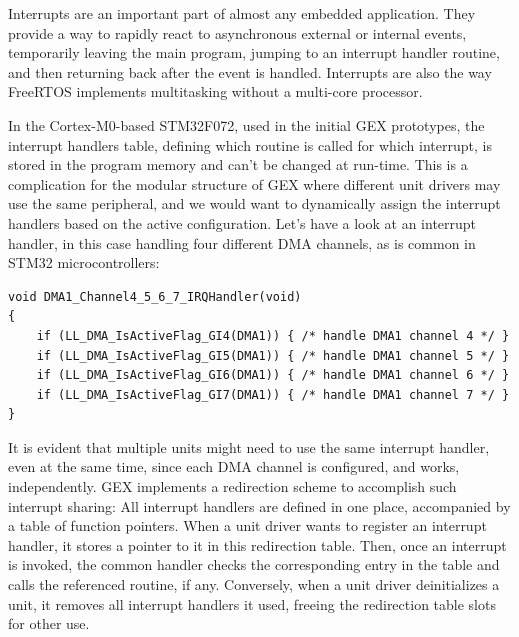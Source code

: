 Interrupts are an important part of almost any embedded application. They provide a way to rapidly react to asynchronous external or internal events, temporarily leaving the main program, jumping to an interrupt handler routine, and then returning back after the event is handled. Interrupts are also the way FreeRTOS implements multitasking without a multi-core processor.

In the Cortex-M0-based STM32F072, used in the initial GEX prototypes, the interrupt handlers table, defining which routine is called for which interrupt, is stored in the program memory and can't be changed at run-time. This is a complication for the modular structure of GEX where different unit drivers may use the same peripheral, and we would want to dynamically assign the interrupt handlers based on the active configuration. Let's have a look at an interrupt handler, in this case handling four different DMA channels, as is common in STM32 microcontrollers:

\begin{verbatim}
void DMA1_Channel4_5_6_7_IRQHandler(void)
{
    if (LL_DMA_IsActiveFlag_GI4(DMA1)) { /* handle DMA1 channel 4 */ }
    if (LL_DMA_IsActiveFlag_GI5(DMA1)) { /* handle DMA1 channel 5 */ }
    if (LL_DMA_IsActiveFlag_GI6(DMA1)) { /* handle DMA1 channel 6 */ }
    if (LL_DMA_IsActiveFlag_GI7(DMA1)) { /* handle DMA1 channel 7 */ }
}
\end{verbatim}

It is evident that multiple units might need to use the same interrupt handler, even at the same time, since each DMA channel is configured, and works, independently. GEX implements a redirection scheme to accomplish such interrupt sharing: All interrupt handlers are defined in one place, accompanied by a table of function pointers. When a unit driver wants to register an interrupt handler, it stores a pointer to it in this redirection table. Then, once an interrupt is invoked, the common handler checks the corresponding entry in the table and calls the referenced routine, if any. Conversely, when a unit driver deinitializes a unit, it removes all interrupt handlers it used, freeing the redirection table slots for other use.











